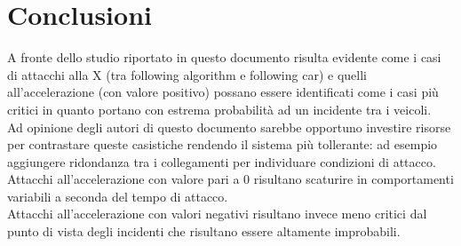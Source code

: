 \section{Conclusioni}
A fronte dello studio riportato in questo documento risulta evidente come i casi di attacchi alla X (tra following algorithm e following car) e quelli all'accelerazione (con valore positivo) possano essere identificati come i casi più critici in quanto portano con estrema probabilità ad un incidente tra i veicoli. \\
Ad opinione degli autori di questo documento sarebbe opportuno investire risorse per contrastare queste casistiche rendendo il sistema più tollerante: ad esempio aggiungere ridondanza tra i collegamenti per individuare condizioni di attacco. \\
Attacchi all'accelerazione con valore pari a 0 risultano scaturire in comportamenti variabili a seconda del tempo di attacco.\\
Attacchi all'accelerazione con valori negativi risultano invece meno critici dal punto di vista degli incidenti che risultano essere altamente improbabili.